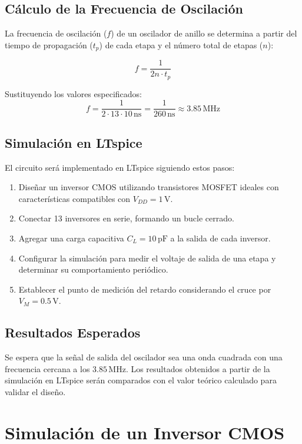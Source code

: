 \documentclass[11pt, a4paper]{article}
\begin{document}
\subsection{Cálculo de la Frecuencia de Oscilación}

La frecuencia de oscilación (\( f \)) de un oscilador de anillo se determina a partir del tiempo de propagación (\( t_p \)) de cada etapa y el número total de etapas (\( n \)):

\[
f = \frac{1}{2n \cdot t_p}
\]

Sustituyendo los valores especificados:
\[
f = \frac{1}{2 \cdot 13 \cdot 10 \, \mathrm{ns}} = \frac{1}{260 \, \mathrm{ns}} \approx 3.85 \, \mathrm{MHz}
\]

\subsection{Simulación en LTspice}

El circuito será implementado en LTspice siguiendo estos pasos:
\begin{enumerate}
    \item Diseñar un inversor CMOS utilizando transistores MOSFET ideales con características compatibles con \( V_{DD} = 1 \, \mathrm{V} \).
    \item Conectar 13 inversores en serie, formando un bucle cerrado.
    \item Agregar una carga capacitiva \( C_L = 10 \, \mathrm{pF} \) a la salida de cada inversor.
    \item Configurar la simulación para medir el voltaje de salida de una etapa y determinar su comportamiento periódico.
    \item Establecer el punto de medición del retardo considerando el cruce por \( V_M = 0.5 \, \mathrm{V} \).
\end{enumerate}

\subsection{Resultados Esperados}

Se espera que la señal de salida del oscilador sea una onda cuadrada con una frecuencia cercana a los \( 3.85 \, \mathrm{MHz} \). Los resultados obtenidos a partir de la simulación en LTspice serán comparados con el valor teórico calculado para validar el diseño.

\section{Simulación de un Inversor CMOS}
\end{document}
